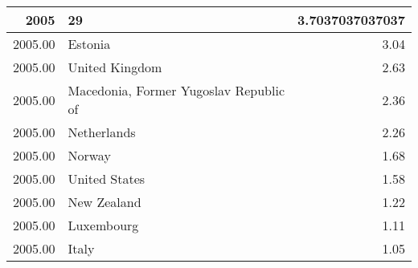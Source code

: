\begin{table}[ht]
\centering
\begin{tabular}{rlr}
  \hline
2005 & 29 & 3.7037037037037 \\ 
  \hline
2005.00 & Estonia & 3.04 \\ 
  2005.00 & United Kingdom & 2.63 \\ 
  2005.00 & Macedonia, Former Yugoslav Republic of & 2.36 \\ 
  2005.00 & Netherlands & 2.26 \\ 
  2005.00 & Norway & 1.68 \\ 
  2005.00 & United States & 1.58 \\ 
  2005.00 & New Zealand & 1.22 \\ 
  2005.00 & Luxembourg & 1.11 \\ 
  2005.00 & Italy & 1.05 \\ 
   \hline
\end{tabular}
\end{table}
